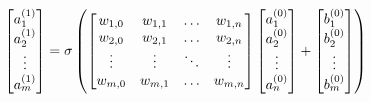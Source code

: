 %
\begin{equation}
    \begin{bmatrix}
        a_{1}^{(1)} \\
        a_{2}^{(1)} \\
        \vdots \\
        a_{m}^{(1)}
    \end{bmatrix} = \sigma
    \begin{pmatrix}
        \color{black}
        \begin{bmatrix}
            w_{1,0} & w_{1,1} & \ldots & w_{1,n} \\
            w_{2,0} & w_{2,1} & \ldots & w_{2,n} \\
            \vdots  & \vdots  & \ddots & \vdots  \\
            w_{m,0} & w_{m,1} & \ldots & w_{m,n}
        \end{bmatrix}
        \begin{bmatrix}
            a_{1}^{(0)} \\
            a_{2}^{(0)} \\
            \vdots \\
            a_{n}^{(0)}
        \end{bmatrix} +
        \begin{bmatrix}
            b_{1}^{(0)} \\
            b_{2}^{(0)} \\
            \vdots \\
            b_{m}^{(0)}
        \end{bmatrix}
    \end{pmatrix}
    \label{eq:ANN_matrix}
\end{equation}

